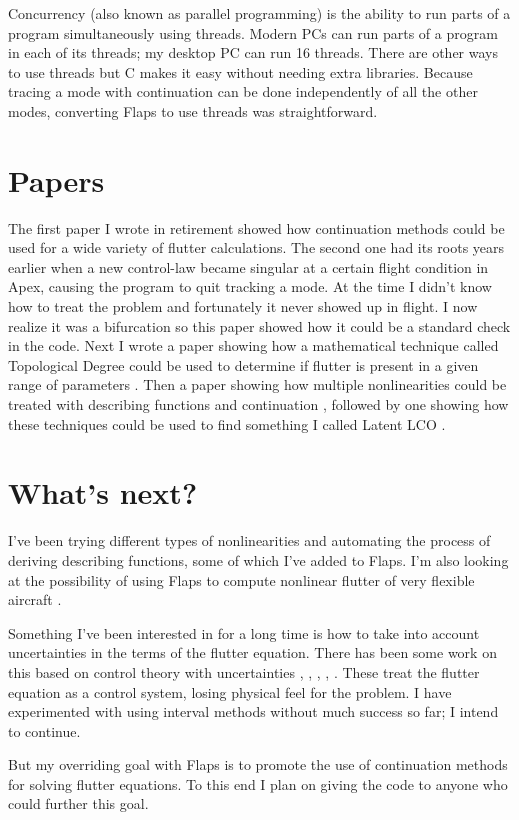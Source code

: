 \documentclass[11pt]{article}
\def\Cpp{{C\nolinebreak[4]\hspace{-.05em}\raisebox{.4ex}{\tiny\bf ++}}\:}
\begin{document}
Concurrency (also known as parallel programming) is the ability to run
parts of a program simultaneously using threads. Modern PCs can run
parts of a program in each of its threads; my desktop PC can run 16
threads. There are other ways to use threads but \Cpp -11 makes it easy
without needing extra libraries.
Because tracing a mode with continuation can be done independently of
all the other modes, converting Flaps to use threads was straightforward.

\section{Papers}
The first paper I wrote in retirement \cite{meyer2014unified} showed how
continuation methods could be used for a wide variety of flutter
calculations. The second one \cite{meyer2015continuation}
had its roots years earlier when a new control-law became singular
at a certain flight condition
in Apex, causing the program to quit tracking a mode.
At the time I didn't know how to treat the problem and fortunately it
never showed up in flight. I now realize it was a bifurcation so this
paper showed how it could be a standard check in the code.
Next I wrote a paper showing how a mathematical technique called
Topological Degree could be used to determine if flutter is present
in a given range of parameters \cite{meyer2015topological}.
Then a paper showing how multiple nonlinearities could be treated with
describing functions and continuation \cite{meyer2016continuation},
followed by one showing how these techniques could be used to find
something I called Latent LCO \cite{meyer2021latent}.

\section{What's next?}
I've been trying different types of nonlinearities and automating
the process of deriving describing functions, some of which I've added
to Flaps. I'm  also looking at the possibility of using Flaps to
compute nonlinear flutter of very flexible aircraft \cite{patil2001limit}.

Something I've been interested in for a long time is how to
take into account uncertainties in the terms of the flutter equation.
There has been some work on this based on control theory with uncertainties
\cite{danowsky2010evaluation}, \cite{iannelli2017nonlinear}, \cite{dai2014methods},
\cite{bueno2015flutter},
\cite{borglund2004mu}.
These treat the flutter equation as a control system, losing physical
feel for the problem. I have experimented with using interval methods
\cite{neumaier1990interval} without much success so far; I intend to
continue.

But my overriding goal with Flaps is to promote the use of continuation
methods for solving flutter equations. To this end I plan on giving the
code to anyone who could further this goal.



% 
% 


\end{document}
